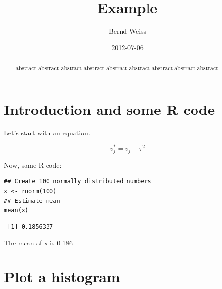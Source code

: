 \documentclass[11pt]{article}
\title{Example}
\author{Bernd Weiss}
\date{2012-07-06}
\begin{document}
\maketitle

\setcounter{tocdepth}{3}
\tableofcontents
\vspace*{1cm}





\begin{abstract}
abstract abstract abstract abstract abstract abstract abstract abstract abstract 
\end{abstract}


\section{Introduction and some R code}
\label{sec-1}


Let's start with an equation: 

\begin{equation}
v^{*}_{j} = v_{j} + \tau^{2} 
\end{equation}

Now, some R code:


\lstset{language=R}
\begin{lstlisting}
## Create 100 normally distributed numbers 
x <- rnorm(100)
## Estimate mean
mean(x)
\end{lstlisting}

\begin{verbatim}
 [1] 0.1856337
\end{verbatim}

The mean of x is 0.186
\section{Plot a histogram}
\label{sec-2}
\end{document}
